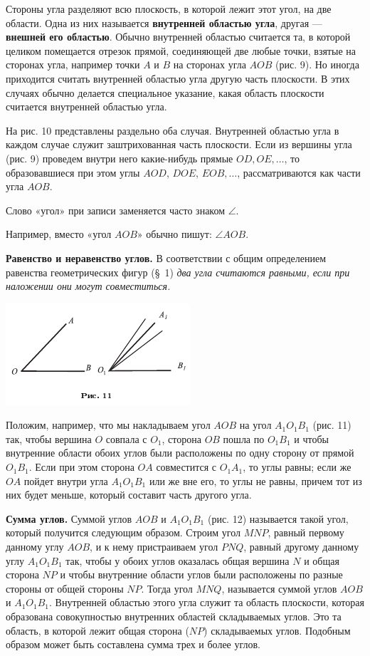 \documentclass[oneside]{book}
\begin{document}
Стороны угла разделяют всю плоскость, в которой лежит этот угол, на две области.
Одна из них называется \textbf{внутренней областью угла}, другая — \textbf{внешней его областью}.
Обычно внутренней областью считается та, в которой целиком помещается отрезок прямой, соединяющей две любые точки, взятые на сторонах угла, например точки $A$ и $B$ на сторонах угла $AOB$ (рис. 9).
Но иногда приходится считать внутренней областью угла другую часть плоскости.
В этих случаях обычно делается специальное указание, какая область плоскости считается внутренней областью угла.

На рис. 10 представлены раздельно оба случая.
Внутренней областью угла в каждом случае служит заштрихованная часть плоскости.
Если из вершины угла (рис. 9) проведем внутри него какие-нибудь прямые $OD, OE,\dots$, то образовавшиеся при этом углы $AOD$, $DOE$, $EOB,\dots$, рассматриваются как части угла $AOB$.

Слово «угол» при записи заменяется часто знаком $\angle$.

Например, вместо «угол $AOB$» обычно пишут:
$\angle AOB$.

\textbf{Равенство и неравенство углов.}
В соответствии с общим определением равенства геометрических фигур (§~1) \emph{два угла считаются равными, если при наложении они могут совместиться.}

\includegraphics{pics/ris-11}

Положим, например, что мы накладываем угол $AOB$ на угол $A_1O_1B_1$ (рис. 11) так, чтобы вершина $O$ совпала с $O_1$, сторона $OB$ пошла по $O_1B_1$ и чтобы внутренние области обоих углов были расположены по одну сторону от прямой $O_1B_1$.
Если при этом сторона $OA$ совместится с $O_1A_1$, то углы равны;
если же $OA$ пойдет внутри угла $A_1O_1B_1$ или же вне его, то углы не равны, причем тот из них будет меньше, который составит часть другого угла.

\textbf{Сумма углов.}
Суммой углов $AOB$ и $A_1O_1B_1$ (рис. 12) называется такой угол, который получится следующим образом.
Строим угол $MNP$, равный первому данному углу $AOB$, и к нему пристраиваем угол $PNQ$, равный другому данному углу $A_1O_1B_1$ так, чтобы у обоих углов оказалась общая вершина $N$ и общая сторона $NP$ и чтобы внутренние области углов были расположены по разные стороны от общей стороны $NP$.
Тогда угол $MNQ$, называется суммой углов $AOB$ и $A_1O_1B_1$.
Внутренней областью этого угла служит та область плоскости, которая образована совокупностью внутренних областей складываемых углов.
Это та область, в которой лежит общая сторона ($NP$) складываемых углов.
Подобным образом может быть составлена сумма трех и более углов.
\end{document}
